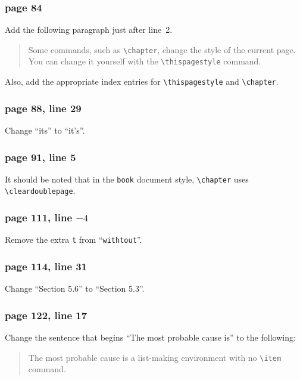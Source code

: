 \subsubsection*{page 84}
Add the following paragraph just after line~2.
\begin{quote}
Some commands, such as \verb|\chapter|, change the style of the current
page.  You can change it yourself with the \verb|\thispagestyle|
command.
\end{quote}
Also, add the appropriate index entries for \verb|\thispagestyle| and
\verb|\chapter|.
 
\subsubsection*{page 88, line 29}
Change ``its'' to ``it's''.
 
\subsubsection*{page 91, line 5}
\begin{sloppypar}
It should be noted that in the {\tt book} document style,
\verb|\chapter| uses \verb|\cleardoublepage|.
\end{sloppypar}
 
\subsubsection*{page 111, line $-4$}
Remove the extra {\tt t} from ``{\tt withtout}''.
 
\subsubsection*{page 114, line 31}
Change ``Section 5.6'' to ``Section 5.3''.
 
 
\subsubsection*{page 122, line 17}
Change the sentence that begins ``The most probable cause is'' to
the following:
\begin{quote}
The most probable cause is a list-making environment with no
\verb|\item| command.
\end{quote}
 

